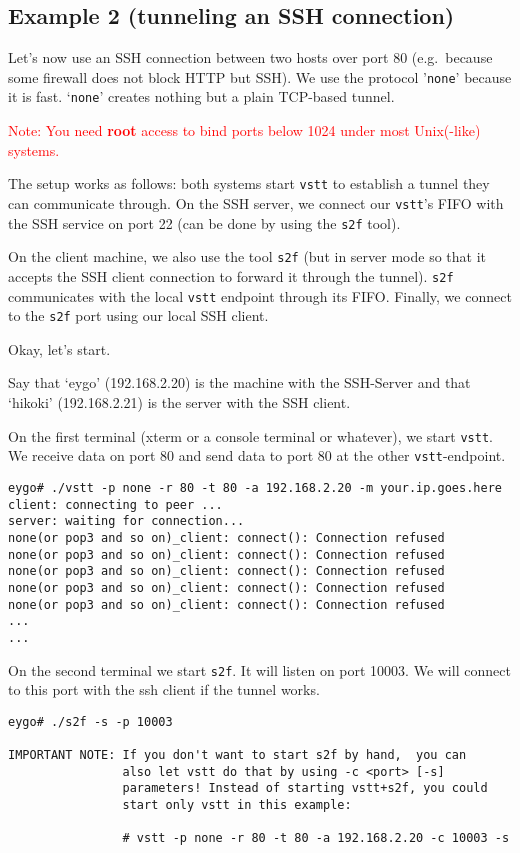 \documentclass[10pt,a4paper]{article}
\begin{document}
\subsection{Example 2 (tunneling an SSH connection)}

Let's now use an SSH connection between two hosts over
port 80 (e.g.\ because some firewall does not block HTTP but SSH).
We use the protocol '\texttt{none}' because it is fast. `\texttt{none}'
creates nothing but a plain TCP-based tunnel.

\textcolor{red}{Note: You need \textbf{root} access to bind ports below
1024 under most Unix(-like) systems.}

The setup works as follows: both systems start \texttt{vstt} to establish a tunnel they
can communicate through. On the SSH server, we connect our \texttt{vstt}'s FIFO
with the SSH service on port 22 (can be done by using the
\texttt{s2f} tool).

On the client machine, we also use the tool \texttt{s2f} (but in server
mode so that it accepts the SSH client connection to forward it through the tunnel). \texttt{s2f} communicates with the local \texttt{vstt} endpoint through its FIFO.
Finally, we connect to the \texttt{s2f} port using our local SSH client.

Okay, let's start.

Say that `eygo' (192.168.2.20) is the machine with the SSH-Server and that
`hikoki' (192.168.2.21) is the server with the SSH client.

On the first terminal (xterm or a console terminal or whatever), we
start \texttt{vstt}. We receive data on port 80 and send data to port 80 at
the other \texttt{vstt}-endpoint.

\begin{verbatim}
eygo# ./vstt -p none -r 80 -t 80 -a 192.168.2.20 -m your.ip.goes.here
client: connecting to peer ...
server: waiting for connection...
none(or pop3 and so on)_client: connect(): Connection refused
none(or pop3 and so on)_client: connect(): Connection refused
none(or pop3 and so on)_client: connect(): Connection refused
none(or pop3 and so on)_client: connect(): Connection refused
none(or pop3 and so on)_client: connect(): Connection refused
...
...
\end{verbatim}

On the second terminal we start \texttt{s2f}. It will listen on port 10003. We will
connect to this port with the ssh client if the tunnel works.

\begin{verbatim}
eygo# ./s2f -s -p 10003

IMPORTANT NOTE: If you don't want to start s2f by hand,  you can
                also let vstt do that by using -c <port> [-s]
                parameters! Instead of starting vstt+s2f, you could
                start only vstt in this example:
                
                # vstt -p none -r 80 -t 80 -a 192.168.2.20 -c 10003 -s
\end{verbatim}
\end{document}

